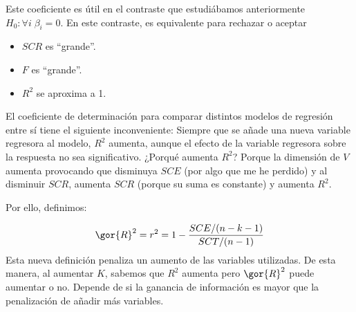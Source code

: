 Este coeficiente es útil en el contraste que estudiábamos anteriormente $H_0: ∀i\;β_i = 0$. En este contraste, es equivalente para rechazar o aceptar \begin{itemize}
	\item $SCR$ es ``grande''.
	\item $F$ es ``grande''.
	\item $R^2$ se aproxima a 1.
\end{itemize}


El coeficiente de determinación para comparar distintos modelos de regresión entre sí tiene el siguiente inconveniente:
Siempre que se añade una nueva variable regresora al modelo, $R^2$ aumenta, aunque el efecto de la variable regresora sobre la respuesta no sea significativo. ¿Porqué aumenta $R^2$? Porque la dimensión de $V$ aumenta provocando que disminuya $SCE$ (por algo que me he perdido) y al disminuir $SCR$, aumenta $SCR$ (porque su suma es constante) y aumenta $R^2$.



Por ello, definimos:


\begin{defn}
\[\gor{R}^2 = r^2 = 1 - \frac{SCE/(n-k-1)}{SCT/(n-1)}\]
Esta nueva definición penaliza un aumento de las variables utilizadas. De esta manera, al aumentar $K$, sabemos que $R^2$ aumenta pero $\gor{R}^2$ puede aumentar o no. Depende de si la ganancia de información es mayor que la penalización de añadir más variables.
\end{defn}

